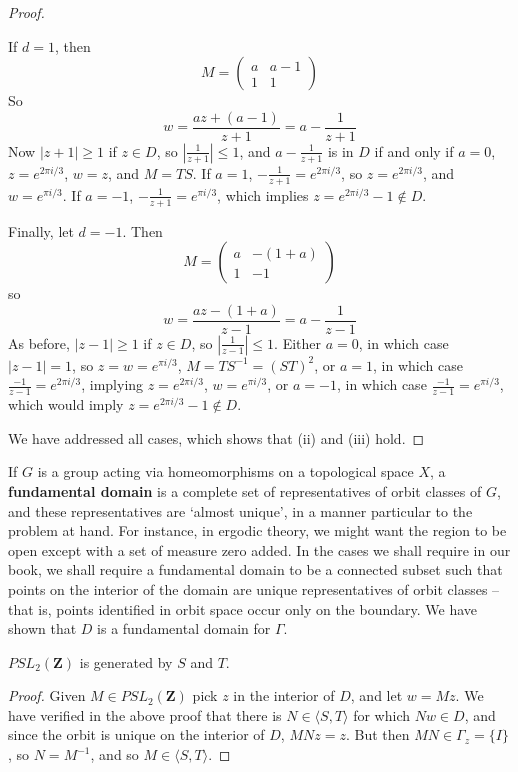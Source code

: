 \begin{proof}
\begin{itemize}
        If $d = 1$, then
        \[ M = \begin{pmatrix} a & a-1 \\ 1 & 1 \end{pmatrix} \]
        So
        \[ w = \frac{az + (a-1)}{z + 1} = a - \frac{1}{z+1} \]
        Now $|z+1| \geq 1$ if $z \in D$, so $|\frac{1}{z+1}| \leq 1$, and $a - \frac{1}{z+1}$ is in $D$ if and only if $a = 0$, $z = e^{2\pi i/3}$, $w = z$, and $M = TS$. If $a = 1$, $- \frac{1}{z+1} = e^{2\pi i/3}$, so $z = e^{2 \pi i/3}$, and $w = e^{\pi i/3}$. If $a = -1$, $- \frac{1}{z+1} = e^{\pi i/3}$, which implies $z = e^{2 \pi i/3} - 1 \not \in D$.

        Finally, let $d = -1$. Then
        \[ M = \begin{pmatrix} a & -(1 + a) \\ 1 & -1 \end{pmatrix} \]
        so
        \[ w = \frac{az - (1+a)}{z-1} = a - \frac{1}{z-1} \]
        As before, $|z-1| \geq 1$ if $z \in D$, so $|\frac{1}{z-1}| \leq 1$. Either $a = 0$, in which case $|z-1| = 1$, so $z = w = e^{\pi i/3}$, $M = TS^{-1} = (ST)^2$, or $a = 1$, in which case $\frac{-1}{z-1} = e^{2\pi i/3}$, implying $z = e^{2\pi i/3}$, $w = e^{\pi i/3}$, or $a = -1$, in which case $\frac{-1}{z-1} = e^{\pi i/3}$, which would imply $z = e^{2\pi i/3} - 1 \not \in D$.
    \end{itemize}
    We have addressed all cases, which shows that (ii) and (iii) hold.
\end{proof}

If $G$ is a group acting via homeomorphisms on a topological space $X$, a {\bf fundamental domain} is a complete set of representatives of orbit classes of $G$, and these representatives are `almost unique', in a manner particular to the problem at hand. For instance, in ergodic theory, we might want the region to be open except with a set of measure zero added. In the cases we shall require in our book, we shall require a fundamental domain to be a connected subset such that points on the interior of the domain are unique representatives of orbit classes -- that is, points identified in orbit space occur only on the boundary. We have shown that $D$ is a fundamental domain for $\Gamma$.

\begin{corollary}
    $PSL_2(\mathbf{Z})$ is generated by $S$ and $T$.
\end{corollary}
\begin{proof}
    Given $M \in PSL_2(\mathbf{Z})$ pick $z$ in the interior of $D$, and let $w = M z$. We have verified in the above proof that there is $N \in \langle S, T \rangle$ for which $Nw \in D$, and since the orbit is unique on the interior of $D$, $MNz = z$. But then $MN \in \Gamma_z = \{ I \}$, so $N = M^{-1}$, and so $M \in \langle S, T \rangle$.
\end{proof}

